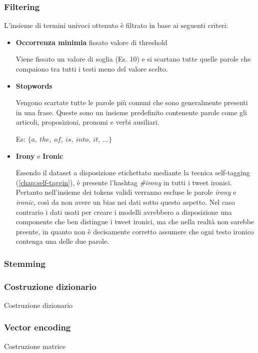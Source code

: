 \documentclass[oneside]{book}
\begin{document}
\subsubsection{Filtering}
L'insieme di termini univoci ottenuto è filtrato in base ai seguenti criteri:
\begin{itemize}
	\item \textbf{Occorrenza minimia} fissato valore di threshold
		
		Viene fissato un valore di soglia (Es. 10) e si scartano tutte quelle parole che compaiono tra tutti i testi meno del valore scelto. 
	\item \textbf{Stopwords}
	
		Vengono scartate tutte le parole più comuni che sono generalmente presenti in una frase. Queste sono un insieme predefinito contenente parole come gli articoli, proposizioni, pronomi e verbi ausiliari.
		
		Es: $\{a,\ the,\ of,\ is,\ into,\ it,\ ...\}$
	
		
	\item \textbf{Irony} e \textbf{Ironic}
	
	Essendo il dataset a disposizione etichettato mediante la tecnica self-tagging (\autoref{chap:self-taggin}), è presente l'hashtag \emph{\#irony} in tutti i tweet ironici. Pertanto nell'insieme dei tokens validi verranno escluse le parole \emph{irony} e \emph{ironic}, così da non avere un bias nei dati sotto questo aspetto. Nel caso contrario i dati usati per creare i modelli avrebbero a disposizione una componente che ben distingue i tweet ironici, ma che nella realtà non sarebbe preente, in quanto non è decisamente corretto assumere che ogni testo ironico contenga una delle due parole.
	
	
\end{itemize}

\subsubsection{Stemming}


\subsubsection{Costruzione dizionario}
Costruzione dizionario

\subsubsection{Vector encoding}
Costruzione matrice
\end{document}
